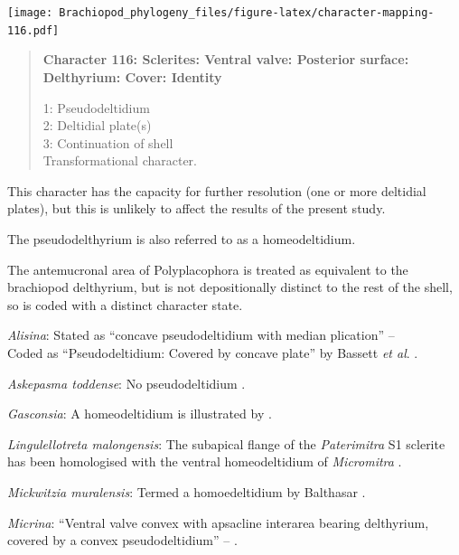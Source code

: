 \documentclass[openany]{book}
\begin{document}
\texttt{[image: Brachiopod\_phylogeny\_files/figure-latex/character-mapping-116.pdf]}

\begin{quote}
\textbf{Character 116: Sclerites: Ventral valve: Posterior surface:
Delthyrium: Cover: Identity}

1: Pseudodeltidium\\
2: Deltidial plate(s)\\
3: Continuation of shell\\
Transformational character.
\end{quote}

This character has the capacity for further resolution (one or more
deltidial plates), but this is unlikely to affect the results of the
present study.

The pseudodelthyrium is also referred to as a homeodeltidium.

The antemucronal area of Polyplacophora is treated as equivalent to the
brachiopod delthyrium, but is not depositionally distinct to the rest of
the shell, so is coded with a distinct character state.

\hypertarget{Alisina-coding-116}{}
\emph{Alisina}: Stated as ``concave pseudodeltidium with median
plication'' -- \citet{Williams2000LinguliformeaCraniiformea}\\
Coded as ``Pseudodeltidium: Covered by concave plate'' by Bassett
\emph{et al}. \citeyearpar{Bassett2001Functionalmorphology}.

\hypertarget{Askepasma_toddense-coding-116}{}
\emph{Askepasma toddense}: No pseudodeltidium
\citep[p.~153]{Williams2000LinguliformeaCraniiformea}.

\hypertarget{Gasconsia-coding-116}{}
\emph{Gasconsia}: A homeodeltidium is illustrated by
\citet{Hanken1985Thetaxonomy}.

\hypertarget{Lingulellotreta_malongensis-coding-116}{}
\emph{Lingulellotreta malongensis}: The subapical flange of the
\emph{Paterimitra} S1 sclerite has been homologised with the ventral
homeodeltidium of \emph{Micromitra} \citep{Larsson2014iPaterimitra}.

\hypertarget{Mickwitzia_muralensis-coding-116}{}
\emph{Mickwitzia muralensis}: Termed a homoedeltidium by Balthasar
\citeyearpar{Balthasar2004Shellstructure}.

\hypertarget{Micrina-coding-116}{}
\emph{Micrina}: ``Ventral valve convex with apsacline interarea bearing
delthyrium, covered by a convex pseudodeltidium'' --
\citet{Holmer2008TheEarly}.
\end{document}
